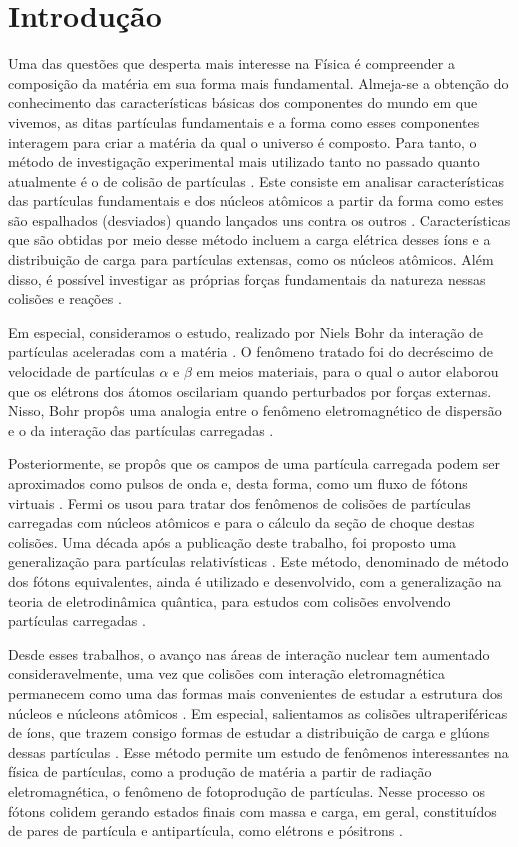 \chapter{Introdução}

Uma das questões que desperta mais interesse na Física é compreender a
composição da matéria em sua forma mais fundamental.  Almeja-se a obtenção do
conhecimento das características básicas dos componentes do mundo em que
vivemos, as ditas partículas fundamentais e a forma como esses componentes
interagem para criar a matéria da qual o universo é composto. Para tanto, o
método de investigação experimental mais utilizado tanto no passado quanto
atualmente é o de colisão de partículas \cite{griffiths_particle}. Este
consiste em analisar características das partículas fundamentais e dos núcleos
atômicos a partir da forma como estes são espalhados (desviados) quando
lançados uns contra os outros \cite{thomson_particle}.  Características que são
obtidas por meio desse método incluem a carga elétrica desses íons e a
distribuição de carga para partículas extensas, como os núcleos atômicos. Além
disso, é possível investigar as próprias forças fundamentais da natureza nessas
colisões e reações \cite{griffiths_particle}.

Em especial, consideramos o estudo, realizado por Niels Bohr da interação de
partículas aceleradas com a matéria \cite{bohr1913}. O fenômeno tratado foi do
decréscimo de velocidade de partículas $\alpha$ e $\beta$ em meios materiais,
para o qual o autor elaborou que os elétrons dos átomos oscilariam quando
perturbados por forças externas. Nisso, Bohr propôs uma analogia entre o
fenômeno eletromagnético de dispersão e o da interação das partículas
carregadas .

Posteriormente, se propôs que os campos de uma partícula carregada podem ser
aproximados como pulsos de onda e, desta forma, como um fluxo de fótons
virtuais \cite{Fermi1924}. Fermi os usou para tratar dos fenômenos de colisões
de partículas carregadas com núcleos atômicos e para o cálculo da seção de
choque destas colisões. Uma década após a publicação deste trabalho, foi
proposto uma generalização para partículas relativísticas \cite{williams1933}.
Este método, denominado de método dos fótons equivalentes, ainda é utilizado e
desenvolvido, com a generalização na teoria de eletrodinâmica quântica, para
estudos com colisões envolvendo partículas carregadas \cite{BALTZ20081}.

Desde esses trabalhos, o avanço nas áreas de interação nuclear tem aumentado
consideravelmente, uma vez que colisões com interação eletromagnética
permanecem como uma das formas mais convenientes de estudar a estrutura dos
núcleos e núcleons atômicos \cite{harland-lang2023}. Em especial, salientamos
as colisões ultraperiféricas de íons, que trazem consigo formas de estudar a
distribuição de carga e glúons dessas partículas \cite{bertulani2005}. Esse
método permite um estudo de fenômenos interessantes na física de partículas,
como a produção de matéria a partir de radiação eletromagnética, o fenômeno de
fotoprodução de partículas. Nesse processo os fótons colidem gerando estados
finais com massa e carga, em geral, constituídos de pares de partícula e
antipartícula, como elétrons e pósitrons \cite{Gerhard_Baur_1998}.

